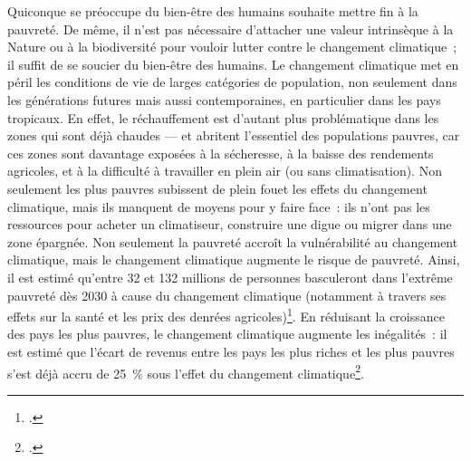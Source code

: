 \documentclass[a5paper,french,openany]{memoir}
\begin{document}
Quiconque se préoccupe du bien-être des humains souhaite mettre fin à la pauvreté. 
De même, il n'est pas nécessaire d'attacher une valeur intrinsèque à la Nature ou à la biodiversité pour vouloir lutter contre le changement climatique~; il suffit de se soucier du bien-être des humains. Le changement climatique met en péril les conditions de vie de larges catégories de population, non seulement dans les générations futures mais aussi contemporaines, en particulier dans les pays tropicaux. En effet, le réchauffement est d'autant plus problématique dans les zones qui sont déjà chaudes --- et abritent l'essentiel des populations pauvres, car ces zones sont davantage exposées à la sécheresse, à la baisse des rendements agricoles, et à la difficulté à travailler en plein air (ou sans climatisation). Non seulement les plus pauvres subissent de plein fouet les effets du changement climatique, mais ils manquent de moyens pour y faire face~: %
ils n'ont pas les ressources pour acheter un climatiseur, construire une digue ou migrer dans une zone épargnée. Non seulement la pauvreté accroît la vulnérabilité au changement climatique, mais le changement climatique augmente le risque de pauvreté. Ainsi, il est estimé qu'entre 32 et 132 millions de personnes basculeront dans l'extrême pauvreté dès 2030 à cause du changement climatique (notamment à travers ses effets sur la santé et les prix des denrées agricoles)\footnote{\cite{jafino_revised_2020}.}. En réduisant la croissance des pays les plus pauvres, le changement climatique augmente les inégalités~: il est estimé que l'écart de revenus entre les pays les plus riches et les plus pauvres s'est déjà accru de 25~\% sous l'effet du changement climatique\footnote{\cite{diffenbaugh_global_2019}.}. %

\end{document}
